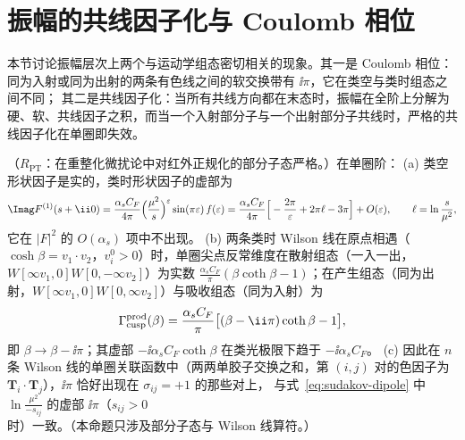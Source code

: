 \section{振幅的共线因子化与 Coulomb 相位}\label{sec:sudakov-collinear}

本节讨论振幅层次上两个与运动学组态密切相关的现象。其一是 Coulomb 相位：同为入射或同为出射的两条有色线之间的软交换带有 $\ii\pi$，它在类空与类时组态之间不同；
其二是共线因子化：当所有共线方向都在末态时，振幅在全阶上分解为硬、软、共线因子之积，而当一个入射部分子与一个出射部分子共线时，严格的共线因子化在单圈即失效。

\begin{proposition}\label{prop:sudakov-coulomb}
（$R_{\mathrm{PT}}$：在重整化微扰论中对红外正规化的部分子态严格。）在单圈阶：
(a) 类空形状因子是实的，类时形状因子的虚部为
\begin{equation}\label{eq:sudakov-coulomb-ff}
\Imag F^{(1)}(s+\ii0)=\frac{\alpha_sC_F}{4\pi}\Big(\frac{\mu^2}{s}\Big)^{\varepsilon}\sin(\pi\varepsilon)\,f(\varepsilon)
=\frac{\alpha_sC_F}{4\pi}\Big[-\frac{2\pi}{\varepsilon}+2\pi\ell-3\pi\Big]+O(\varepsilon),\qquad \ell=\ln\frac{s}{\mu^2},
\end{equation}
它在 $|F|^2$ 的 $O(\alpha_s)$ 项中不出现。
(b) 两条类时 Wilson 线在原点相遇（$\cosh\beta=v_1\cdot v_2$，$v_i^0>0$）时，单圈尖点反常维度在散射组态（一入一出，$W[\infty v_1,0]W[0,-\infty v_2]$）为实数
$\frac{\alpha_sC_F}\pi(\beta\coth\beta-1)$；在产生组态（同为出射，$W[\infty v_1,0]W[0,\infty v_2]$）与吸收组态（同为入射）为
\begin{equation}\label{eq:sudakov-coulomb-cusp}
\Gamma_{\rm cusp}^{\rm prod}(\beta)=\frac{\alpha_sC_F}{\pi}\big[(\beta-\ii\pi)\coth\beta-1\big],
\end{equation}
即 $\beta\to\beta-\ii\pi$；其虚部 $-\ii\alpha_sC_F\coth\beta$ 在类光极限下趋于 $-\ii\alpha_sC_F$。
(c) 因此在 $n$ 条 Wilson 线的单圈关联函数中（两两单胶子交换之和，第 $(i,j)$ 对的色因子为 $\mathbf T_i\cdot\mathbf T_j$），$\ii\pi$ 恰好出现在 $\sigma_{ij}=+1$ 的那些对上，
与式~\eqref{eq:sudakov-dipole} 中 $\ln\frac{\mu^2}{-s_{ij}}$ 的虚部 $\ii\pi$（$s_{ij}>0$ 时）一致。（本命题只涉及部分子态与 Wilson 线算符。）
\end{proposition}

